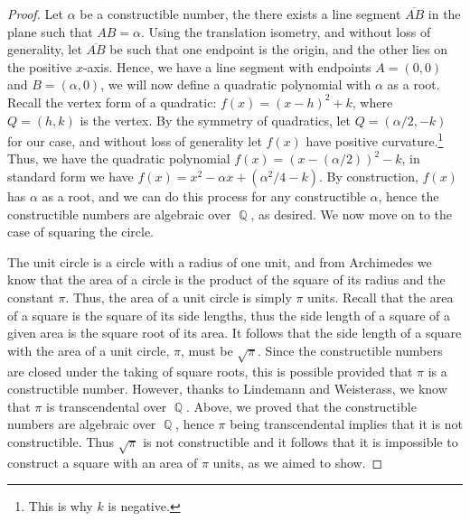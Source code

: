 \documentclass[letterpaper, 12pt]{amsart}
\DeclareMathOperator{\Q}{\mathbb{Q}}
\theoremstyle{definition}  %
\begin{document}
	\begin{proof}
	Let $\alpha$ be a constructible number, the there exists a line segment $\overline{AB}$ in the plane such that $AB = \alpha$.
	Using the translation isometry, and without loss of generality, let $\overline{AB}$ be such that one endpoint is the origin, and the other lies on the positive $x$-axis.
	Hence, we have a line segment with endpoints $A = (0,0)$ and $B = (\alpha,0)$, we will now define a quadratic polynomial with $\alpha$ as a root.
	Recall the vertex form of a quadratic: $f(x) = (x - h)^{2} + k$, where $Q = (h,k)$ is the vertex.
	By the symmetry of quadratics, let $Q = (\alpha/2,-k)$ for our case, and without loss of generality let $f(x)$ have positive curvature.\footnote{This is why $k$ is negative.}
	Thus, we have the quadratic polynomial $f(x) = (x - (\alpha/2))^{2} - k$, in standard form we have $f(x) = x^{2} - \alpha x + (\alpha^{2}/4 - k)$.
	By construction, $f(x)$ has $\alpha$ as a root, and we can do this process for any constructible $\alpha$, hence the constructible numbers are algebraic over $\Q$, as desired.
	We now move on to the case of squaring the circle.

	The unit circle is a circle with a radius of one unit, and from Archimedes we know that the area of a circle is the product of the square of its radius and the constant $\pi$.
	Thus, the area of a unit circle is simply $\pi$ units.
	Recall that the area of a square is the square of its side lengths, thus the side length of a square of a given area is the square root of its area.
	It follows that the side length of a square with the area of a unit circle, $\pi$, must be $\sqrt{\pi}$.
	Since the constructible numbers are closed under the taking of square roots, this is possible provided that $\pi$ is a constructible number.
	However, thanks to Lindemann and Weisterass, we know that $\pi$ is transcendental over $\Q$.
	Above, we proved that the constructible numbers are algebraic over $\Q$, hence $\pi$ being transcendental implies that it is not constructible. 
	Thus $\sqrt{\pi}$ is not constructible and it follows that it is impossible to construct a square with an area of $\pi$ units, as we aimed to show.
	\end{proof}
\end{document}
